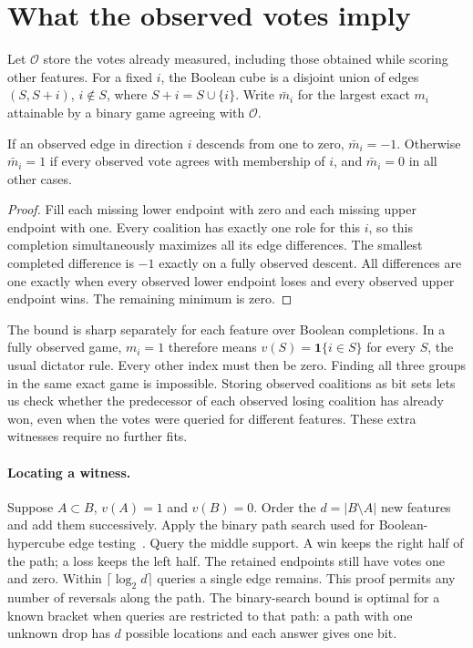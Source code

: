 \section{What the observed votes imply}
Let $\mathcal O$ store the votes already measured, including those obtained while
scoring other features. For a fixed $i$, the Boolean cube is a disjoint union
of edges $(S,S+i)$, $i\notin S$, where $S+i=S\cup\{i\}$. Write $\bar m_i$
for the largest exact $m_i$ attainable by a binary game agreeing with $\mathcal O$.

\begin{proposition}
If an observed edge in direction $i$ descends from one to zero, $\bar m_i=-1$.
Otherwise $\bar m_i=1$ if every observed vote agrees with membership of $i$,
and $\bar m_i=0$ in all other cases.
\end{proposition}
\begin{proof}
Fill each missing lower endpoint with zero and each missing upper endpoint with
one. Every coalition has exactly one role for this $i$, so this completion
simultaneously maximizes all its edge differences. The smallest completed
difference is $-1$ exactly on a fully observed descent. All differences are
one exactly when every observed lower endpoint loses and every observed upper
endpoint wins. The remaining minimum is zero.
\end{proof}
The bound is sharp separately for each feature over Boolean completions.
In a fully observed game, $m_i=1$ therefore means $v(S)=\mathbf1\{i\in S\}$
for every $S$, the usual dictator rule. Every other index must then be zero.
Finding all three groups in the same exact game is impossible. Storing observed
coalitions as bit sets lets us check whether the predecessor of each observed
losing coalition has already won, even when the votes were queried for different
features. These extra witnesses require no further fits.

\paragraph{Locating a witness.}
Suppose $A\subset B$, $v(A)=1$ and $v(B)=0$. Order the $d=|B\setminus A|$
new features and add them successively. Apply the binary path search used
for Boolean-hypercube edge testing~\cite{chen2019unateness}. Query the middle support.
A win keeps the right half of the path; a loss keeps the left half.
The retained endpoints still have votes one and zero. Within
$\lceil\log_2 d\rceil$ queries a single edge remains. This proof permits
any number of reversals along the path. The binary-search bound is optimal
for a known bracket when queries are restricted to that path: a path with one
unknown drop has $d$ possible locations and each answer gives one bit.

